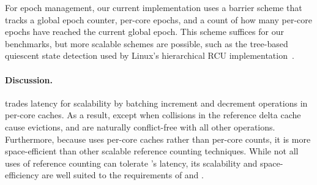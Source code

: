 For epoch management, our current implementation uses a barrier scheme
that tracks a global epoch counter, per-core epochs, and a count of
how many per-core epochs have reached the current global epoch.  This
scheme suffices for our benchmarks, but more scalable schemes are
possible, such as the tree-based quiescent state detection used
by Linux's hierarchical RCU implementation~\cite{lwn:treercu}.

\paragraph{Discussion.}
 trades latency for scalability by batching increment and
decrement operations in per-core caches.  As a result, except when
collisions in the reference delta cache cause evictions, 
and  are naturally conflict-free with all other operations.
%
Furthermore, because  uses per-core caches
rather than per-core counts, it is more space-efficient than other
scalable reference counting techniques.  While not all uses of
reference counting can tolerate 's latency, its scalability
and space-efficiency are well suited to the requirements of \vm and
\fs.

